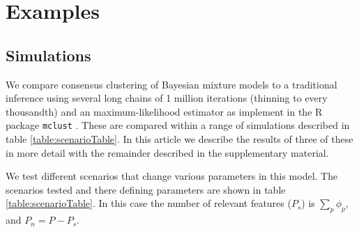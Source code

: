 \documentclass{bioinfo}
\begin{document}
\section{Examples}

\subsection{Simulations}

We compare consensus clustering of Bayesian mixture models to a traditional inference using several long chains of 1 million iterations (thinning to every thousandth) and an maximum-likelihood estimator as implement in the R package \texttt{mclust} \citealp{mclust2016scrucca}. These are compared within a range of simulations described in table \ref{table:scenarioTable}. In this article we describe the results of three of these in more detail with the remainder described in the supplementary material.

We test different scenarios that change various parameters in this model. The scenarios tested and there defining parameters are shown in table \ref{table:scenarioTable}. In this case the number of relevant features (\(P_s\)) is $\sum_p \phi_p$, and $P_n = P - P_s$.
\end{document}
